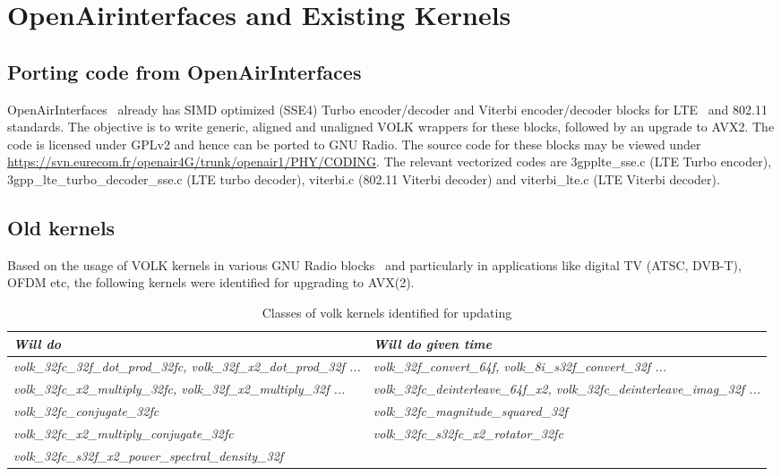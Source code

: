 \documentclass[a4paper,12pt,oneside]{article}
\begin{document}
\section{OpenAirinterfaces and Existing Kernels}

\subsection{Porting code from OpenAirInterfaces}
\label{sec:openair}
OpenAirInterfaces~\cite{openair} already has SIMD optimized (SSE4) Turbo encoder/decoder and Viterbi encoder/decoder blocks for LTE~\cite{lte} and 802.11~\cite{802.11} standards. The objective is to write generic, aligned and unaligned VOLK wrappers for these blocks, followed by an upgrade to AVX2. The code is licensed under GPLv2 and hence can be ported to GNU Radio. The source code for these blocks may be viewed under \url{https://svn.eurecom.fr/openair4G/trunk/openair1/PHY/CODING}. The relevant vectorized codes are 3gpplte\_sse.c (LTE Turbo encoder), 3gpp\_lte\_turbo\_decoder\_sse.c (LTE turbo decoder), viterbi.c (802.11 Viterbi decoder) and viterbi\_lte.c (LTE Viterbi decoder).

\subsection{Old kernels}
\label{sec:old-kernels}
Based on the usage of VOLK kernels in various GNU Radio blocks~\cite{volk-stats} and particularly in applications like digital TV (ATSC, DVB-T), OFDM etc, the following kernels were identified for upgrading to AVX(2).

\begin{table}[h]
\centering
\begin{tabular}{ >{\itshape}p{7.7cm} | >{\itshape}p{6.3cm} }
\hline 
\textnormal{\bfseries Will do} & \textnormal{\bfseries Will do given time} \\ \hline \hline
volk\_32fc\_32f\_dot\_prod\_32fc, volk\_32f\_x2\_dot\_prod\_32f ... & volk\_32f\_convert\_64f, volk\_8i\_s32f\_convert\_32f ... \\ \hline 
volk\_32fc\_x2\_multiply\_32fc, volk\_32f\_x2\_multiply\_32f ... & volk\_32fc\_deinterleave\_64f\_x2, volk\_32fc\_deinterleave\_imag\_32f ... \\ \hline
volk\_32fc\_conjugate\_32fc & volk\_32fc\_magnitude\_squared\_32f \\ \hline
volk\_32fc\_x2\_multiply\_conjugate\_32fc & volk\_32fc\_s32fc\_x2\_rotator\_32fc \\ \hline
volk\_32fc\_s32f\_x2\_power\_spectral\_density\_32f \\ \hline
\end{tabular}
\caption{Classes of volk kernels identified for updating}
\label{tab:table1}
\end{table}
\end{document}
